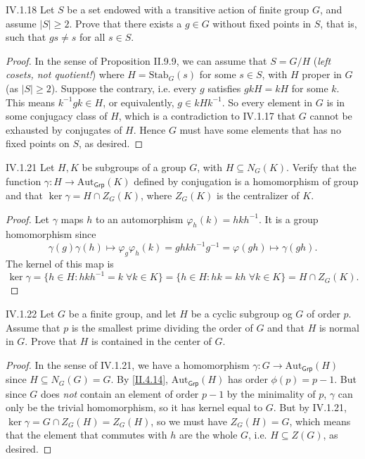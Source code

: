 \begin{problem}{IV.1.18}
Let $S$ be a set endowed with a transitive action of finite group $G$, and assume $|S| \geq 2$. Prove that there exists a $g \in G$ without fixed points in $S$, that is, such that $gs \neq s$ for all $s \in S$.
\end{problem}
\begin{proof}
In the sense of Proposition II.9.9, we can assume that $S = G/H$ (\emph{left cosets, not quotient!}) where $H = \text{Stab}_G(s)$ for some $s \in S$, with $H$ proper in $G$ (as $|S| \geq 2$). Suppose the contrary, i.e. every $g$ satisfies $gkH = kH$ for some $k$. This means $k^{-1}gk \in H$, or equivalently, $g \in kHk^{-1}$. So every element in $G$ is in some conjugacy class of $H$, which is a contradiction to IV.1.17 that $G$ cannot be exhausted by conjugates of $H$. Hence $G$ must have some elements that has no fixed points on $S$, as desired.
\end{proof}


\begin{problem}{IV.1.21}
Let $H,K$ be subgroups of a group $G$, with $H \subseteq N_G(K)$. Verify that the function $\gamma: H \to \text{Aut}_\mathsf{Grp}(K)$ defined by conjugation is a homomorphism of group and that $\ker \gamma = H \cap Z_G(K)$, where $Z_G(K)$ is the centralizer of $K$.	
\end{problem}
\begin{proof}
Let $\gamma$ maps $h$ to an automorphism $\varphi_h(k) = hkh^{-1}$. It is a group homomorphism since
\[
\gamma(g)\gamma(h) \mapsto \varphi_g \varphi_h(k) = ghkh^{-1}g^{-1} = \varphi(gh) \mapsto \gamma(gh).
\]
The kernel of this map is 
\[
\ker \gamma = \{h \in H: hkh^{-1} = k \; \forall k \in K\} = \{h \in H: hk = kh \; \forall k \in K\} = H \cap Z_G(K).	
\]
\end{proof}

\begin{problem}{IV.1.22}
Let $G$ be a finite group, and let $H$ be a cyclic subgroup og $G$ of order $p$. Assume that $p$ is the smallest prime dividing the order of $G$ and that $H$ is normal in $G$. Prove that $H$ is contained in the center of $G$.
\end{problem}
\begin{proof}
In the sense of IV.1.21, we have a homomorphism $\gamma:G \to \text{Aut}_\mathsf{Grp}(H)$ since $H \subseteq N_G(G) = G$. By \ref{II.4.14}, $\text{Aut}_\mathsf{Grp}(H)$ has order $\phi(p)=p-1$. But since $G$ does \emph{not} contain an element of order $p-1$ by the minimality of $p$, $\gamma$ can only be the trivial homomorphism, so it has kernel equal to $G$. But by IV.1.21, $\ker \gamma = G \cap Z_G(H) = Z_G(H)$, so we must have $Z_G(H) = G$, which means that the element that commutes with $h$ are the whole $G$, i.e. $H \subseteq Z(G)$, as desired. 
\end{proof}


